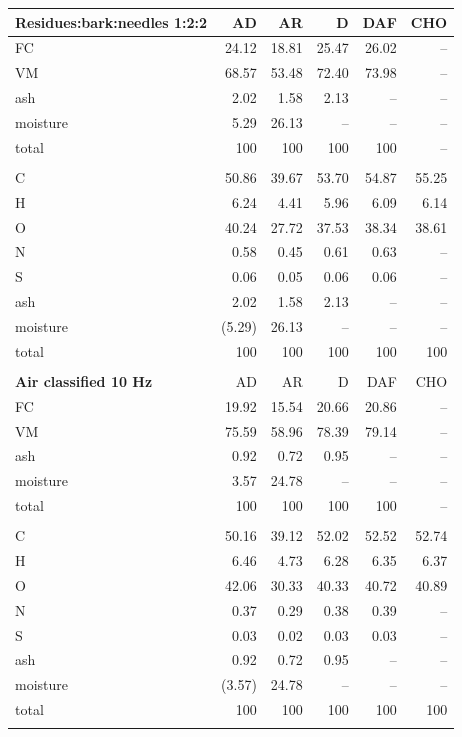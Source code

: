 \begin{center}
\begin{longtable}{lrrrrr}
    \textbf{Residues:bark:needles 1:2:2} & AD & AR & D & DAF & CHO \\
    \midrule
    FC       & 24.12  & 18.81  & 25.47  & 26.02  & -- \\
    VM       & 68.57  & 53.48  & 72.40  & 73.98  & -- \\
    ash      & 2.02   & 1.58   & 2.13   & --     & -- \\
    moisture & 5.29   & 26.13  & --     & --     & -- \\
    total    & 100    & 100    & 100    & 100    & -- \\
    \\
    C        & 50.86  & 39.67  & 53.70  & 54.87  & 55.25 \\
    H        & 6.24   & 4.41   & 5.96   & 6.09   & 6.14 \\
    O        & 40.24  & 27.72  & 37.53  & 38.34  & 38.61 \\
    N        & 0.58   & 0.45   & 0.61   & 0.63   & -- \\
    S        & 0.06   & 0.05   & 0.06   & 0.06   & -- \\
    ash      & 2.02   & 1.58   & 2.13   & --     & -- \\
    moisture & (5.29) & 26.13  & --     & --     & -- \\
    total    & 100    & 100    & 100    & 100    & 100 \\
    \\

    \textbf{Air classified 10 Hz} & AD & AR & D & DAF & CHO \\
    \midrule
    FC       & 19.92  & 15.54  & 20.66  & 20.86  & -- \\
    VM       & 75.59  & 58.96  & 78.39  & 79.14  & -- \\
    ash      & 0.92   & 0.72   & 0.95   & --     & -- \\
    moisture & 3.57   & 24.78  & --     & --     & -- \\
    total    & 100    & 100    & 100    & 100    & -- \\
    \\
    C        & 50.16  & 39.12  & 52.02  & 52.52  & 52.74 \\
    H        & 6.46   & 4.73   & 6.28   & 6.35   & 6.37 \\
    O        & 42.06  & 30.33  & 40.33  & 40.72  & 40.89 \\
    N        & 0.37   & 0.29   & 0.38   & 0.39   & -- \\
    S        & 0.03   & 0.02   & 0.03   & 0.03   & -- \\
    ash      & 0.92   & 0.72   & 0.95   & --     & -- \\
    moisture & (3.57) & 24.78  & --     & --     & -- \\
    total    & 100    & 100    & 100    & 100    & 100 \\
    \\


\end{longtable}
\end{center}
